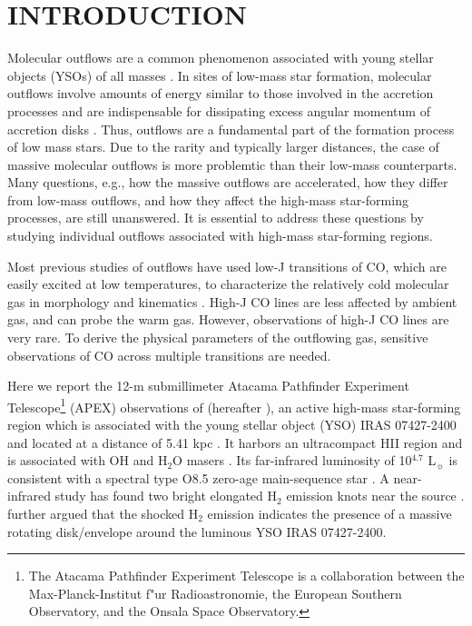 \section{INTRODUCTION}
Molecular outflows are a common phenomenon associated with young stellar objects (YSOs) of all masses \citep{ 1985ARA&A..23..267L,1993prpl.conf..603F,2001ApJ...552L.167Z,2002A&A...383..892B,2015MNRAS.453..645M}. In sites of low-mass star formation, molecular outflows involve amounts of energy similar to those involved in the accretion processes and are indispensable for dissipating excess angular momentum of accretion disks \citep{1987ARA&A..25...23S, 1996ARA&A..34..111B}. Thus, outflows are a fundamental part of the formation process of low mass stars. Due to the rarity and typically larger distances, the case of massive molecular outflows is more problemtic than their low-mass counterparts. Many questions, e.g., how the massive outflows are accelerated, how they differ from low-mass outflows, and how they affect the high-mass star-forming processes, are still unanswered. It is essential to address these questions by studying individual outflows associated with high-mass star-forming regions. 

Most previous studies of outflows have used low-J transitions of CO, which are easily excited at low temperatures, to characterize the relatively cold molecular gas in morphology and kinematics \citep{2009ApJ...696...66Q,  2009ApJ...702L..66Q, 2011ApJ...728....6Q}. High-J CO lines are less affected by ambient gas, and can probe the warm gas. However, observations of high-J CO lines are very rare. To derive the physical parameters of the outflowing gas, sensitive observations of CO across multiple transitions are needed. 

Here we report the 12-m submillimeter Atacama Pathfinder Experiment Telescope\footnote{    The Atacama Pathfinder Experiment Telescope is a collaboration between the Max-Planck-Institut f"ur Radioastronomie, the European Southern Observatory, and the Onsala Space Observatory.} (APEX) observations of  (hereafter ), an active high-mass star-forming region which is associated with the young stellar object (YSO) IRAS 07427-2400 and located at a distance of 5.41 kpc \citep{2015PASJ...67...69S}. It harbors an ultracompact HII region and is associated with OH and H$_2$O masers \citep{1993AJ....105.1495H,1997MNRAS.289..203C,1998AJ....116.1897M,1999ApJS..123..487M,2003MNRAS.341..551C}. Its far-infrared luminosity of 10$^{4.7}$ L$_\sun$ is consistent with a spectral type O8.5 zero-age main-sequence star \citep{1998AJ....116.1897M}. A near-infrared study has found two bright elongated H$_2$ emission knots near the source \citep{2002ApJ...576..313K}. \citet{2003A&A...412..175K} further argued that the shocked H$_2$ emission indicates the presence of a massive rotating disk/envelope around the luminous YSO IRAS 07427-2400. 

